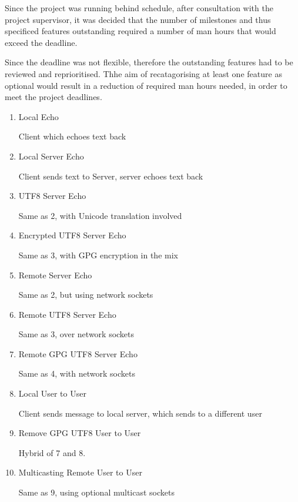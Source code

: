 
Since the project was running behind schedule, after consultation with
the project supervisor, it was decided that the number of milestones and
thus specificed features outstanding required a number of man hours that
would exceed the deadline.


Since the deadline was not flexible, therefore the outstanding
features had to be reviewed and reprioritised. Thhe aim of
recatagorising at least one feature as optional would result in a
reduction of required man hours needed, in order to meet the project
deadlines.

\begin{table}[Hbt]

\begin{center}

\begin{enumerate}


\item Local Echo 

	\subitem Client which echoes text back

\item Local Server Echo 

	\subitem Client sends text to Server, server echoes text back

\item UTF8 Server Echo 

	\subitem Same as 2, with Unicode translation involved

\item Encrypted UTF8 Server Echo 

	\subitem Same as 3, with GPG encryption in the mix

\item Remote Server Echo 

	\subitem Same as 2, but using network sockets

\item Remote UTF8 Server Echo 

	\subitem Same as 3, over network sockets

\item Remote GPG UTF8 Server Echo 

	\subitem Same as 4, with network sockets

\item Local User to User 

	\subitem Client sends message to local server, which sends to a 
	different user

\item Remove GPG UTF8 User to User 

	\subitem Hybrid of 7 and 8.

\item Multicasting Remote User to User 

	\subitem Same as 9, using optional multicast sockets

\end{enumerate}

\end{center}

\caption{List of Initial Milestones}

\end{table}


